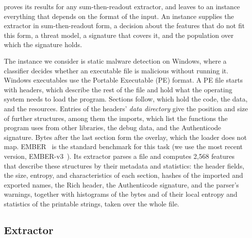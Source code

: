 
 proves its results for any sum-then-readout extractor, and leaves to an instance everything
that depends on the format of the input. An instance supplies the extractor in sum-then-readout form, a decision about
the features that do not fit this form, a threat model, a signature that covers it, and the population over which
the signature holds.

The instance we consider is static malware detection on Windows, where a classifier decides whether an executable
file is malicious without running it. Windows executables use the Portable Executable (PE) format. A PE file starts
with headers, which describe the rest of the file and hold what the operating system needs to load the program.
Sections follow, which hold the code, the data, and the resources. Entries of the headers' \emph{data directory} give the
position and size of further structures, among them the imports, which list the functions the program uses from other libraries, the
debug data, and the Authenticode signature. Bytes after the last section form the overlay, which
the loader does not map. EMBER~\cite{anderson2018ember} is the standard benchmark for this task (we use the most
recent version, EMBER-v3~\cite{joyce2025ember}). Its extractor parses a file and computes 2,568 features that describe
these structures by their metadata and statistics: the header fields, the size, entropy, and characteristics of each
section, hashes of the imported and exported names, the Rich header, the Authenticode signature, and the parser's
warnings, together with histograms of the bytes and of their local entropy and statistics of the printable strings,
taken over the whole file.

\subsection{Extractor}
\label{sec:instances:record}


